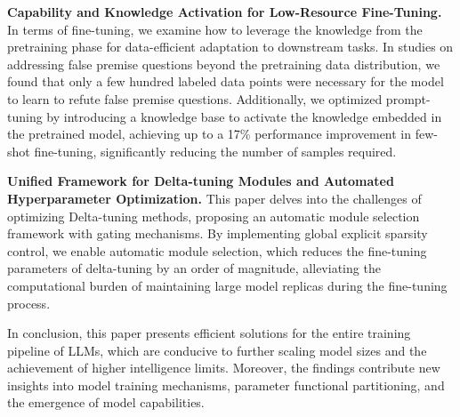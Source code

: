 \begin{abstract*}
\textbf{Capability and Knowledge Activation for Low-Resource Fine-Tuning.}
In terms of fine-tuning, we examine how to leverage the knowledge from the pretraining phase for data-efficient adaptation to downstream tasks. In studies on addressing false premise questions beyond the pretraining data distribution, we found that only a few hundred labeled data points were necessary for the model to learn to refute false premise questions. Additionally, we optimized prompt-tuning by introducing a knowledge base to activate the knowledge embedded in the pretrained model, achieving up to a 17\% performance improvement in few-shot fine-tuning, significantly reducing the number of samples required.
  
\textbf{Unified Framework for Delta-tuning Modules and Automated Hyperparameter Optimization.} This paper delves into the challenges of optimizing Delta-tuning methods, proposing an automatic module selection framework with gating mechanisms. By implementing global explicit sparsity control, we enable automatic module selection, which reduces the fine-tuning parameters of delta-tuning by an order of magnitude, alleviating the computational burden of maintaining large model replicas during the fine-tuning process.
  
In conclusion, this paper presents efficient solutions for the entire training pipeline of LLMs, which are conducive to further scaling model sizes and the achievement of higher intelligence limits. Moreover, the findings contribute new insights into model training mechanisms, parameter functional partitioning, and the emergence of model capabilities.

\end{abstract*}
